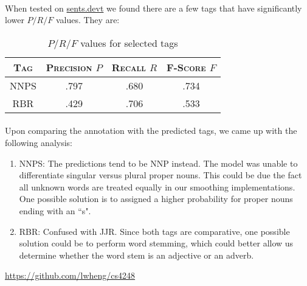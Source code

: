 \documentclass[12pt]{article}
\begin{document}
\paragraph{}
When tested on \url{sents.devt} we found there are a few tags that have significantly lower $P/R/F$ values. They are:

\begin{table}[h]
	\center
	\begin{tabular}{ c  c  c  c}
		\textsc{Tag} & \textsc{Precision $P$} & \textsc{Recall $R$} & \textsc{F-Score $F$} \\
		\hline
		NNPS & .797 & .680 & .734\\
		RBR & .429 & .706 & .533\\
	\end{tabular}
	\caption{$P/R/F$ values for selected tags}
	\label{tab:tenfold}
\end{table}

\paragraph{}
Upon comparing the annotation with the predicted tags, we came up with the following analysis:
\begin{enumerate}
\item NNPS: The predictions tend to be NNP instead. The model was unable to differentiate singular versus plural proper nouns. This could be due the fact all unknown words are treated equally in our smoothing implementations. One possible solution is to assigned a higher probability for proper nouns ending with an ``s".
\item RBR: Confused with JJR. Since both tags are comparative, one possible solution could be to perform word stemming, which could better allow us determine whether the word stem is an adjective or an adverb.
\end{enumerate}

\vfill
\begin{center}
\url{https://github.com/lwheng/cs4248}
\end{center}
\end{document}
